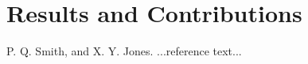 \documentclass{sigplanconf}
\begin{document}
\section{Results and Contributions}





\begin{thebibliography}{}
\softraggedright

P. Q. Smith, and X. Y. Jones. ...reference text...

\end{thebibliography}
\end{document}
